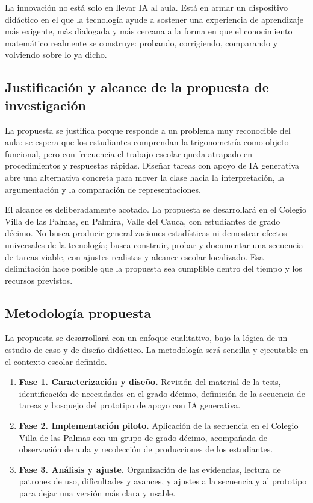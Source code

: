\documentclass[11pt,spanish,letterpaper,openany]{book}
\begin{document}
La innovación no está solo en llevar IA al aula. Está en armar un dispositivo didáctico en el que la tecnología ayude a sostener una experiencia de aprendizaje más exigente, más dialogada y más cercana a la forma en que el conocimiento matemático realmente se construye: probando, corrigiendo, comparando y volviendo sobre lo ya dicho.

\subsection{Justificación y alcance de la propuesta de investigación}

La propuesta se justifica porque responde a un problema muy reconocible del aula: se espera que los estudiantes comprendan la trigonometría como objeto funcional, pero con frecuencia el trabajo escolar queda atrapado en procedimientos y respuestas rápidas. Diseñar tareas con apoyo de IA generativa abre una alternativa concreta para mover la clase hacia la interpretación, la argumentación y la comparación de representaciones.

El alcance es deliberadamente acotado. La propuesta se desarrollará en el Colegio Villa de las Palmas, en Palmira, Valle del Cauca, con estudiantes de grado décimo. No busca producir generalizaciones estadísticas ni demostrar efectos universales de la tecnología; busca construir, probar y documentar una secuencia de tareas viable, con ajustes realistas y alcance escolar localizado. Esa delimitación hace posible que la propuesta sea cumplible dentro del tiempo y los recursos previstos.

\subsection{Metodología propuesta}

La propuesta se desarrollará con un enfoque cualitativo, bajo la lógica de un estudio de caso y de diseño didáctico. La metodología será sencilla y ejecutable en el contexto escolar definido.

\begin{enumerate}
\item \textbf{Fase 1. Caracterización y diseño.} Revisión del material de la tesis, identificación de necesidades en el grado décimo, definición de la secuencia de tareas y bosquejo del prototipo de apoyo con IA generativa.
\item \textbf{Fase 2. Implementación piloto.} Aplicación de la secuencia en el Colegio Villa de las Palmas con un grupo de grado décimo, acompañada de observación de aula y recolección de producciones de los estudiantes.
\item \textbf{Fase 3. Análisis y ajuste.} Organización de las evidencias, lectura de patrones de uso, dificultades y avances, y ajustes a la secuencia y al prototipo para dejar una versión más clara y usable.
\end{enumerate}
\end{document}
